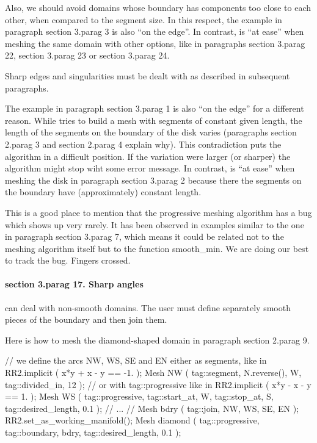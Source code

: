 Also, we should avoid domains whose boundary has components too close to each other,
when compared to the segment size.
In this respect, the example in paragraph \numb section 3.\numb parag 3 is also
``on the edge''.
In contrast, {\maniFEM} is ``at ease'' when meshing the same domain with other options,
like in paragraphs \numb section 3.\numb parag 22, \numb section 3.\numb parag 23 or
\numb section 3.\numb parag 24.

Sharp edges and singularities must be dealt with as described in subsequent paragraphs.

The example in paragraph \numb section 3.\numb parag 1 is also ``on the edge''
for a different reason.
While {\maniFEM} tries to build a mesh with segments of constant given length,
the length of the segments on the boundary of the disk varies (paragraphs
\numb section 2.\numb parag 3 and \numb section 2.\numb parag 4 explain why).
This contradiction puts the algorithm in a difficult position.
If the variation were larger (or sharper) the algorithm might stop wiht some error message.
In contrast, {\maniFEM} is ``at ease'' when meshing the disk in paragraph
\numb section 3.\numb parag 2 because there the segments on the boundary have (approximately)
constant length.

This is a good place to mention that the progressive meshing algorithm has a bug
which shows up very rarely.
It has been observed in examples similar to the one in paragraph \numb section 3.\numb parag 7,
which means it could be related not to the meshing algorithm itself but to the function
{\codett smooth\_min}.
We are doing our best to track the bug. Fingers crossed.


\paragraph{\numb section 3.\numb parag 17. Sharp angles}

{\ManiFEM} can deal with non-smooth domains.
The user must define separately smooth pieces of the boundary and then join them.

Here is how to mesh the diamond-shaped domain in paragraph \numb section 2.\numb parag 9.

\verbatim
   // we define the arcs NW, WS, SE and EN either as segments, like in
   RR2.implicit ( x*y + x - y == -1. );
   Mesh NW ( tag::segment, N.reverse(), W, tag::divided_in, 12 );
   // or with tag::progressive like in
   RR2.implicit ( x*y - x - y ==  1. );
   Mesh WS ( tag::progressive, tag::start_at, W, tag::stop_at, S,
             tag::desired_length, 0.1 );
   // ... //
   Mesh bdry ( tag::join, NW, WS, SE, EN );
   RR2.set_as_working_manifold();
   Mesh diamond ( tag::progressive, tag::boundary, bdry, tag::desired_length, 0.1 );
\endverbatim

